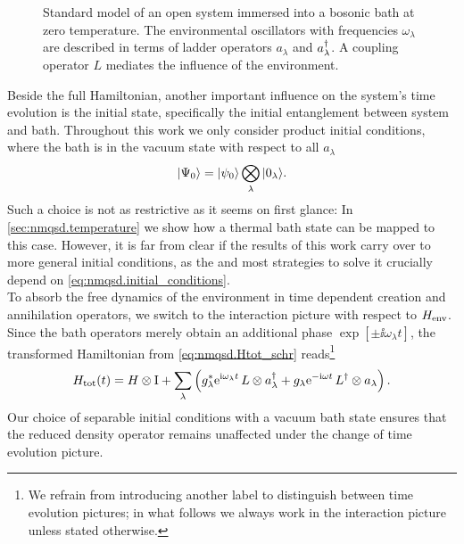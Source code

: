 \begin{figure}
  \centering
  
  \caption{%
    Standard model of an open system immersed into a bosonic bath at zero temperature.
    The environmental oscillators with frequencies $\omega_\lambda$ are described in terms of ladder operators $a_\lambda$ and $a^\dagger_\lambda$.
    A coupling operator $L$ mediates the influence of the environment.
  }
  \label{fig:nmqsd.open_system}
\end{figure}

Beside the full Hamiltonian, another important influence on the system's time evolution is the initial state, specifically the initial entanglement between system and bath.
Throughout this work we only consider product initial conditions, where the bath is in the vacuum state with respect to all $a_\lambda$
\begin{equation}
  | \Psi_0 \rangle = | \psi_0 \rangle \bigotimes\limits_\lambda | 0_\lambda \rangle.
  \label{eq:nmqsd.initial_conditions}
\end{equation}
Such a choice is not as restrictive as it seems on first glance: In \autoref{sec:nmqsd.temperature} we show how a thermal bath state can be mapped to this case.
However, it is far from clear if the results of this work carry over to more general initial conditions, as the \NMSSE and most strategies to solve it crucially depend on \autoref{eq:nmqsd.initial_conditions}.\\



To absorb the free dynamics of the environment in time dependent creation and annihilation operators, we switch to the interaction picture with respect to $H_\mathrm{env}$.
Since the bath operators merely obtain an additional phase $\exp[\pm \ii \omega_\lambda t]$, the transformed Hamiltonian from \autoref{eq:nmqsd.Htot_schr} reads\footnote{%
  We refrain from introducing another label to distinguish between time evolution pictures; in what follows we always work in the interaction picture unless stated otherwise.
}
\begin{equation}
  \Htot(t) = \Hsys \otimes \unit  +  \sum_\lambda \left( \cc{g}_\lambda \exp[\ii \omega_\lambda t] \, L \otimes \adj{a}_\lambda + g_\lambda \exp[-\ii \omega t] \, \adj{L} \otimes a_\lambda \right).
  \label{eq:nmqsd.Htot}
\end{equation}
Our choice of separable initial conditions with a vacuum bath state ensures that the reduced density operator remains unaffected under the change of time evolution picture.

